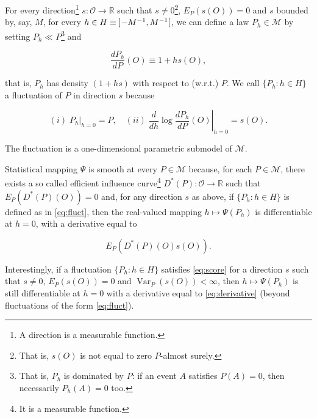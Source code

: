 \documentclass[]{article}
\let\rmarkdownfootnote\footnote%
\def\footnote{\protect\rmarkdownfootnote}
\DeclareMathOperator{\Var}{Var}
\newcommand{\bbR}{\mathbb{R}}
\newcommand{\calM}{\mathcal{M}}
\newcommand{\calO}{\mathcal{O}}
\theoremstyle{definition}
\theoremstyle{definition}
\theoremstyle{definition}
\theoremstyle{remark}
\begin{document}
For every direction\footnote{A direction is a measurable function.}
\(s : \calO \to \bbR\) such that
\(s \neq 0\)\footnote{That is, $s(O)$ is  not equal to zero
$P$-almost surely.}, \(E_{P} (s(O)) = 0\) and \(s\) bounded by, say,
\(M\), for every \(h \in H \equiv \interval[open]{-M^{-1}}{M^{-1}}\), we
can define a law \(P_{h} \in \calM\) by setting
\(P_{h} \ll P\)\footnote{That  is, $P_{h}$  is
dominated  by $P$:  if an  event $A$  satisfies $P(A)  = 0$,  then necessarily
$P_{h} (A) = 0$ too.} and

\begin{equation}\label{eq:fluct}\frac{dP_{h}}{dP}(O)    \equiv     1    +    h
s(O),\end{equation}

that is, \(P_{h}\) has density \((1 + h s)\) with respect to (w.r.t.)
\(P\). We call \(\{P_{h} : h \in H\}\) a fluctuation of \(P\) in
direction \(s\) because

\begin{equation}\label{eq:score}(i)  \;  P_{h}|_{h=0}  =   P,  \quad  (ii)  \;
\left.\frac{d}{dh}       \log        \frac{dP_{h}}{dP}(O)\right|_{h=0}       =
s(O).\end{equation}

The fluctuation is a one-dimensional parametric submodel of \(\calM\).

Statistical mapping \(\Psi\) is smooth at every \(P \in \calM\) because,
for each \(P \in \calM\), there exists a so called efficient influence
curve\footnote{It
is  a   measurable  function.} \(D^{*}(P) : \calO \to \bbR\) such that
\(E_{P}(D^{*}(P)(O)) = 0\) and, for any direction \(s\) as above, if
\(\{P_{h} : h \in H\}\) is defined as in \eqref{eq:fluct}, then the
real-valued mapping \(h \mapsto \Psi(P_{h})\) is differentiable at
\(h=0\), with a derivative equal to

\begin{equation}\label{eq:derivative}E_{P} \left(D^{*}(P)(O) s(O)\right).\end{equation}

Interestingly, if a fluctuation \(\{P_{h} : h \in H\}\) satisfies
\eqref{eq:score} for a direction \(s\) such that \(s\neq 0\),
\(E_{P}(s(O)) = 0\) and \(\Var_{P} (s(O)) < \infty\), then
\(h \mapsto \Psi(P_{h})\) is still differentiable at \(h=0\) with a
derivative equal to \eqref{eq:derivative} (beyond fluctuations of the
form \eqref{eq:fluct}).
\end{document}

